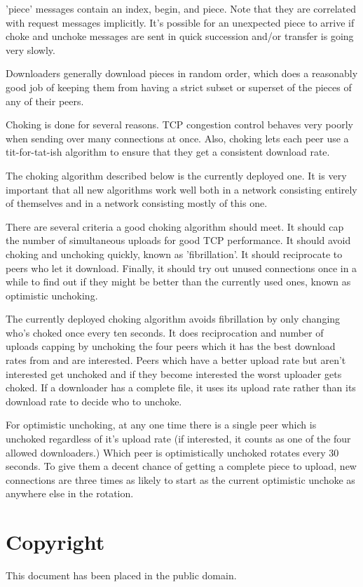 \documentclass{article}
\begin{document}
'piece' messages contain an index, begin, and piece. Note that they are correlated with request messages implicitly. It's possible for an unexpected piece to arrive if choke and unchoke messages are sent in quick succession and/or transfer is going very slowly.

Downloaders generally download pieces in random order, which does a reasonably good job of keeping them from having a strict subset or superset of the pieces of any of their peers.

Choking is done for several reasons. TCP congestion control behaves very poorly when sending over many connections at once. Also, choking lets each peer use a tit-for-tat-ish algorithm to ensure that they get a consistent download rate.

The choking algorithm described below is the currently deployed one. It is very important that all new algorithms work well both in a network consisting entirely of themselves and in a network consisting mostly of this one.

There are several criteria a good choking algorithm should meet. It should cap the number of simultaneous uploads for good TCP performance. It should avoid choking and unchoking quickly, known as 'fibrillation'. It should reciprocate to peers who let it download. Finally, it should try out unused connections once in a while to find out if they might be better than the currently used ones, known as optimistic unchoking.

The currently deployed choking algorithm avoids fibrillation by only changing who's choked once every ten seconds. It does reciprocation and number of uploads capping by unchoking the four peers which it has the best download rates from and are interested. Peers which have a better upload rate but aren't interested get unchoked and if they become interested the worst uploader gets choked. If a downloader has a complete file, it uses its upload rate rather than its download rate to decide who to unchoke.

For optimistic unchoking, at any one time there is a single peer which is unchoked regardless of it's upload rate (if interested, it counts as one of the four allowed downloaders.) Which peer is optimistically unchoked rotates every 30 seconds. To give them a decent chance of getting a complete piece to upload, new connections are three times as likely to start as the current optimistic unchoke as anywhere else in the rotation.

{\section {Copyright}}
This document has been placed in the public domain.
\end{document}
